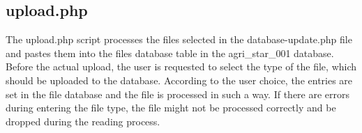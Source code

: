 \subsection{upload.php}
The upload.php script processes the files selected in the database-update.php file and pastes them into the files database table in the agri\_star\_001 database. Before the actual upload, the user is requested to select the type of the file, which should be uploaded to the database. According to the user choice, the entries are set in the file database and the file is processed in such a way. If there are errors during entering the file type, the file might not be processed correctly and be dropped during the reading process.
